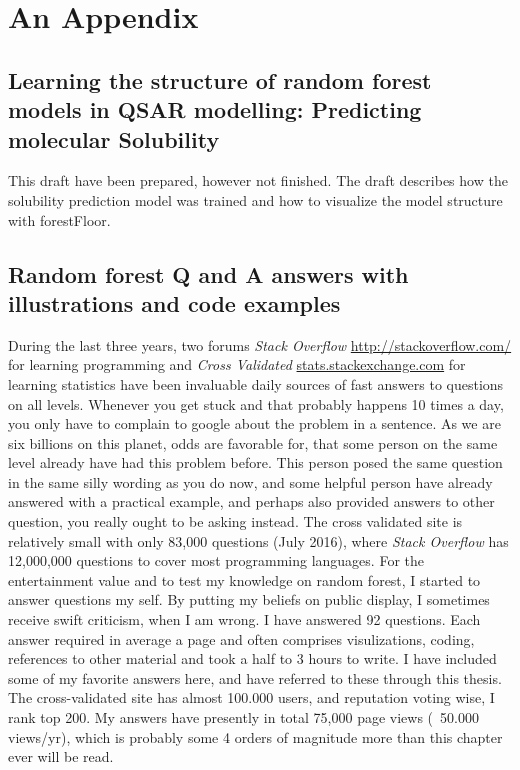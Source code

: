 \chapter{An Appendix}

\section{Learning the structure of random forest models in QSAR
modelling: Predicting molecular Solubility}
\label{article:solubility}

This draft have been prepared, however not finished. The draft describes how the solubility prediction model was trained and how to visualize the model structure with forestFloor.



\section{Random forest Q and A answers with illustrations and code examples}

During the last three years, two forums \textit{Stack Overflow} \url{http://stackoverflow.com/} for learning programming and \textit{Cross Validated} \url{stats.stackexchange.com} for learning statistics have been invaluable daily sources of fast answers to questions on all levels. Whenever you get stuck and that probably happens 10 times a day, you only have to complain to google about the problem in a sentence. As we are six billions on this planet, odds are favorable for, that some person on the same level already have had this problem before. This person posed the same question in the same silly wording as you do now, and some helpful person have already answered with a practical example, and perhaps also provided answers to other question, you really ought to be asking instead. The cross validated site is relatively small with only 83,000 questions (July 2016), where \textit{Stack Overflow} has 12,000,000 questions to cover most programming languages. For the entertainment value and to test my knowledge on random forest, I started to answer questions my self. By putting my beliefs on public display, I sometimes receive swift criticism, when I am wrong. I have answered 92 questions. Each answer required in average a page and often comprises visulizations, coding, references to other material and took a half to 3 hours to write. I have included some of my favorite answers here, and have referred to these through this thesis. The cross-validated site has almost 100.000 users, and reputation voting wise, I rank top 200. My answers have presently in total 75,000 page views (~50.000 views/yr), which is probably some 4 orders of magnitude more than this chapter ever will be read.


